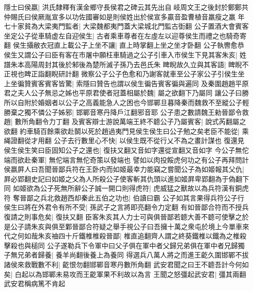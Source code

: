 隱士曰侯嬴|{
	洪氏隸釋有漢金鄉守長侯君之碑云其先出自岐周文王之後封於鄭鄭共仲賜氏曰侯厥胤宣多以功佐國審如是則侯姓出於侯宣多贏音盈曹植音羸瘦之羸}
年七十家貧為大梁夷門監者|{
	大梁魏都夷門蓋大梁城北門監古衘翻}
公子置酒大會賓客坐定公子從車騎虚左自迎侯生|{
	古者乘車尊者在左虛左以迎尊侯生而禮之也騎奇寄翻}
侯生攝敝衣冠直上載公子上坐不讓|{
	直上時掌翻上坐之坐才卧翻}
公子執轡愈恭侯生又謂公子曰臣有客在市屠中願枉車騎過之公子引車入市侯生下見其客朱亥|{
	姓譜朱本高陽周封其後於邾後為楚所滅子孫乃去邑氏朱}
睥睨故久立與其客語|{
	睥睨不正視也睥正詣翻睨研計翻}
微察公子公子色愈和乃謝客就車至公子家公子引侯生坐上坐徧贊賓客賓客皆驚|{
	索隱曰贊告也謂以侯生徧告賓客徧與遍同}
及秦圍趙趙平原君之夫人公子無忌之姊也平原君使者冠蓋相屬於魏|{
	屬之欲翻下乃屬同}
讓公子曰勝所以自附於婚姻者以公子之高義能急人之困也今邯鄲旦暮降秦而魏救不至縱公子輕勝棄之獨不憐公子姊邪|{
	邯鄲音寒丹降戶江翻邪音耶}
公子患之數請魏王勑晉鄙令救趙|{
	數所角翻令力丁翻}
及賓客辯士游說萬端王終不聼公子乃屬賓客|{
	說式芮翻屬之欲翻}
約車騎百餘乘欲赴鬬以死於趙過夷門見侯生侯生曰公子勉之矣老臣不能從|{
	乘䋲證翻從才用翻}
公子去行數里心不快|{
	以侯生既不從行乂不為之畫計謀也}
復還見侯生侯生笑曰臣固知公子之還也|{
	復扶又翻又音如字還從宣翻又音如字}
今公子無佗端而欲赴秦軍|{
	無佗端言無佗奇策以發端也}
譬如以肉投餒虎何功之有公子再拜問計侯嬴屛人曰吾聞晉鄙兵符在王卧内而如姬最幸力能竊之嘗聞公子為如姬報其父仇|{
	屛必郢翻史記曰如姬之父為人所殺公子使客斬其仇頭以進如姬屛卑郢翻為于偽翻下同}
如姬欲為公子死無所辭公子誠一開口則得虎符|{
	虎威猛之獸故以為兵符漢有銅虎符}
奪晉鄙之兵北救趙西却秦此五伯之功也|{
	伯讀曰霸}
公子如其言果得兵符公子行侯生曰將在外君令有所不受|{
	孫武子之言將即亮翻令力定翻}
有如晉鄙合符而不授兵復請之則事危矣|{
	復扶又翻}
臣客朱亥其人力士可與俱晉鄙若聼大善不聼可使擊之於是公子請朱亥與俱至鄴晉鄙合符疑之舉手視公子曰吾擁十萬之衆屯於境上今單車來代之何如哉朱亥䄂四十斤鐵椎椎殺晉鄙|{
	椎直追翻齊人謂之終葵鐵椎以鐵為之椎殺擊殺也與槌同}
公子遂勒兵下令軍中曰父子俱在軍中者父歸兄弟俱在軍中者兄歸獨子無兄弟者歸養|{
	養羊尚翻後養上為養同}
得選兵八萬人將之而進王齕久圍邯鄲不拔諸侯來救戰數不利|{
	齕恨勿翻邯鄲音寒丹數所角翻}
武安君聞之曰王不聼吾計今何如矣|{
	白起以為邯鄲未易攻而王齕軍果不利故以為言}
王聞之怒彊起武安君|{
	彊其兩翻}
武安君稱病篤不肯起

